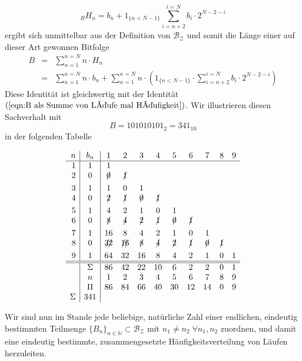 \documentclass[11pt,oneside,a4paper]{scrreprt}
\begin{document}
\begin{equation}
_BH_n=b_n+ 1_{\{n< N-1\}} \sum_{i=n+2}^{i=N} b_{i}\cdot 2^{N-2-i}
\end{equation} 
ergibt sich unmittelbar aus der Definition von $\mathcal{B_Z}$ und somit die Länge einer auf dieser Art gewonnen Bitfolge
\begin{eqnarray}
B & = & \sum_{n=1}^{n=N} n\cdot H_n \\
& = & \sum_{n=1}^{n=N}   n\cdot b_n+ \sum_{n=1}^{n=N}  n \cdot \left( 1_{\{n< N-1\}} \cdot \sum_{i=n+2}^{i=N} b_{i}\cdot 2^{N-2-i} \right)
\end{eqnarray}
Diese Identität ist gleichwertig mit der Identität $(\ref{eqn:B als Summe von Läufe mal Häufigkeit})$. Wir illustrieren diesen Sachverhalt mit 
\begin{equation}
B=101010101_2=341_{10}
\end{equation} 
in der folgenden Tabelle\\
\begin{center}
\begin{displaymath}
\begin{array}{r|c|ccccccccc}
n&b_n&1&2&3&4&5&6&7&8&9\\\hline
1&1& 1&  &&  &&&& \\
2&0&\xout    0&  \xout 1&   &&&&& \\
3&1&  1&  0&  1&&&&& \\
4&0& \xout  2& \xout  1& \xout  0&\xout 1&&&& \\
5&1&  4&  2&  1&0&1&&& \\
6&0& \xout  8&\xout   4& \xout  2&\xout 1&\xout 0&\xout 1&& \\
7&1&16&  8&  4&2&1&0&1& \\
8&0&\xout {32}&\xout {16}&\xout   8&\xout 4&\xout 2&\xout 1 &\xout 0&\xout 1& \\
9&1&64&32&16&8&4&2&1&0&1\\\hline\hline
&\Sigma&86&42&22&10&6&2&2&0& 1\\
&n&1&2&3&4&5&6&7&8&9\\
&\Pi&86&84&66&40&30&12&14&0&9 \\
\Sigma&341&&&&&&&&&\\
\end{array}
\end{displaymath}
\end{center}

\noindent Wir sind nun im Stande jede beliebige, natürliche Zahl einer endlichen, eindeutig bestimmten Teilmenge  $\{B_n\}_{n\in\mathbb N} \subset \mathcal{B_Z}$ mit $n_1\neq n_2\;\forall n_1,n_2$  zuordnen, und damit eine eindeutig bestimmte, zusammengesetzte Häufigkeitsverteilung von Läufen herzuleiten.\\
\end{document}
